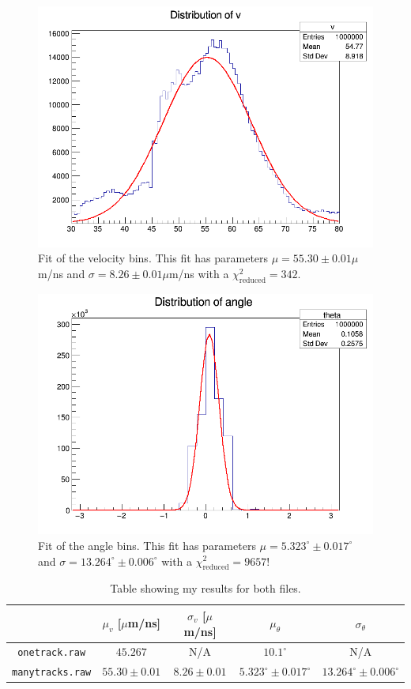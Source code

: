 \documentclass[11pt]{article}
\begin{document}
\begin{figure}
    \centering
    \includegraphics[width=0.8\linewidth]{tex/velocity_fit.png}
    \caption{Fit of the velocity bins. This fit has parameters $\mu=55.30 \pm 0.01 \mu$m/ns  and $\sigma= 8.26 \pm 0.01 \mu$m/ns with a $\chi^2_\text{reduced}=342$.}
    \label{fig:velocity-fit}
\end{figure}

\begin{figure}
    \centering
    \includegraphics[width=0.8\linewidth]{tex/angle_fit.png}
    \caption{Fit of the angle bins. This fit has parameters $\mu = 5.323^{\circ} \pm 0.017^{\circ}$ and $\sigma= 13.264^{\circ} \pm 0.006^{\circ} $ with a $\chi^2_\text{reduced}=9657$!}
    \label{fig:angle-fit}
\end{figure}

\begin{table}[]
    \centering
    \begin{tabular}{c|c|c|c|c}
         & $\mu_v$ [$\mu$m/ns] & $\sigma_v$ [$\mu$m/ns] & $\mu_\theta$ & $\sigma_\theta$ \\
         \hline
        \texttt{onetrack.raw} & $45.267$ & N/A & $10.1^\circ$ & N/A \\
        \texttt{manytracks.raw} & $55.30 \pm 0.01$ & $8.26 \pm 0.01$ & $5.323^{\circ} \pm 0.017^{\circ}$ & $13.264^{\circ} \pm 0.006^{\circ}$
    \end{tabular}
    \caption{Table showing my results for both files.}
    \label{tab:results}
\end{table}
\end{document}
